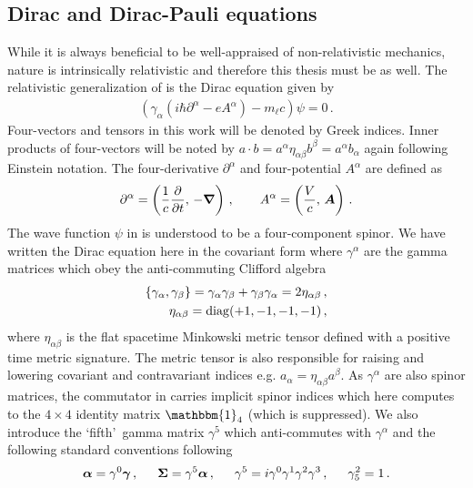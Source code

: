 \subsection{Dirac and Dirac-Pauli equations}
\label{sec:dp}
\noindent While it is always beneficial to be well-appraised of non-relativistic mechanics, nature is intrinsically relativistic and therefore this thesis must be as well. The relativistic generalization of  is the Dirac equation given by
\begin{align}
    \label{dirac:1}
    \left(\gamma_{\alpha}\left(i\hbar\partial^{\alpha} - eA^{\alpha}\right)-m_{\ell}c\right)\psi=0\,.
\end{align}
Four-vectors and tensors in this work will be denoted by Greek indices. Inner products of four-vectors will be noted by $a\cdot b=a^{\alpha}\eta_{\alpha\beta}b^{\beta}=a^{\alpha}b_{\alpha}$ again following Einstein notation. The four-derivative $\partial^{\alpha}$ and four-potential $A^{\alpha}$ are defined as
\begin{align}
    \label{dirac:2}
    \partial^{\alpha}=\left(\frac{1}{c}\frac{\partial}{\partial t},\,-\boldsymbol{\nabla}\right)\,,\qquad A^{\alpha}=\left(\frac{V}{c},\,\boldsymbol{A}\right)\,.
\end{align}
The wave function $\psi$ in  is understood to be a four-component spinor. We have written the Dirac equation here in the covariant form where $\gamma^{\alpha}$ are the gamma matrices which obey the anti-commuting Clifford algebra
\begin{align}
    \label{gamma:1}
    \{\gamma_{\alpha},\gamma_{\beta}\}=\gamma_{\alpha}\gamma_{\beta} + \gamma_{\beta}\gamma_{\alpha} = 2\eta_{\alpha\beta}\,,\\
    \eta_{\alpha\beta}={\rm diag}(+1,-1,-1,-1)\,,
\end{align}
where $\eta_{\alpha\beta}$ is the flat spacetime Minkowski metric tensor defined with a positive time metric signature. The metric tensor is also responsible for raising and lowering covariant and contravariant indices e.g. $a_{\alpha}=\eta_{\alpha\beta}a^{\beta}$. As $\gamma^{\alpha}$ are also spinor matrices, the commutator in  carries implicit spinor indices which here computes to the $4\times4$ identity matrix $\mathbbm{1}_{4}$ (which is suppressed). We also introduce the \lq fifth\rq\ gamma matrix $\gamma^{5}$ which anti-commutes with $\gamma^{\alpha}$ and the following standard conventions following~\cite{Itzykson:1980rh}
\begin{alignat}{1}
	\label{conventions:1} \bb{\alpha}=\gamma^{0}\bb{\gamma}\,,\indent \bb{\Sigma}=\gamma^{5}\bb{\alpha}\,,\indent \gamma^{5}=i\gamma^{0}\gamma^{1}\gamma^{2}\gamma^{3}\,,\indent \gamma^{2}_{5}=1\,.
\end{alignat}

